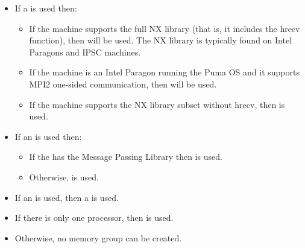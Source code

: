 \begin{itemize}


   \item If a  is used then:

     \begin{itemize}

        \item If the machine supports the full NX library (that is, it
           includes the hrecv function), then 
           will be used.  The NX library is typically found on Intel
           Paragons and IPSC machines.

        \item If the machine is an Intel Paragon running the Puma OS and
           it supports MPI2 one-sided communication, then
            will be used.

        \item If the machine supports the NX library subset without hrecv,
           then  is used.

     \end{itemize}


   \item If an  is used then:

     \begin{itemize}

        \item If the has the Message Passing Library then
            is used.

        \item Otherwise,  is used.

     \end{itemize}


   \item If an  is used, then a
       is used.


   \item If there is only one processor, then  is
       used.

   \item Otherwise, no memory group can be created.

\end{itemize}

